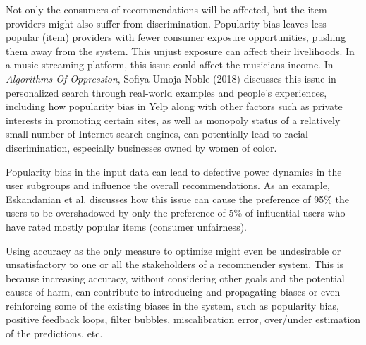 Not only the consumers of recommendations will be affected, but the item providers might also suffer from discrimination. Popularity bias leaves less popular (item) providers with fewer consumer exposure opportunities, pushing them away from the system. This unjust exposure can affect their livelihoods. In a music streaming platform, this issue could affect the musicians income. In \textit{Algorithms Of Oppression}, Sofiya Umoja Noble (2018) \cite{noble2018algorithms} discusses this issue in personalized search through real-world examples and people's experiences, including how popularity bias in Yelp along with other factors such as private interests in promoting certain sites, as well as monopoly status of a relatively small number of Internet search engines, can potentially lead to racial discrimination, especially businesses owned by women of color.

Popularity bias in the input data can lead to defective power dynamics in the user subgroups and influence the overall recommendations. As an example, Eskandanian et al. \cite{Eskandanian2019power} discusses how this issue can cause the preference of 95\% the users to be overshadowed by only the preference of 5\% of influential users who have rated mostly popular items (consumer unfairness).

Using accuracy as the only measure to optimize might even be undesirable or unsatisfactory to one or all the stakeholders of a recommender system. This is because increasing accuracy, without considering other goals and the potential causes of harm, can contribute to introducing and propagating biases or even reinforcing some of the existing biases in the system, such as popularity bias, positive feedback loops, filter bubbles, miscalibration error, over/under estimation of the predictions, etc. 




